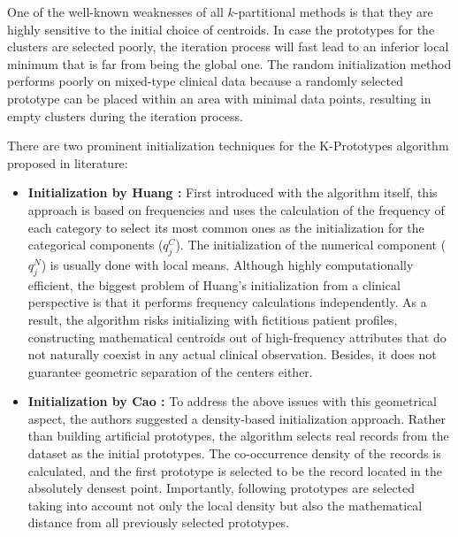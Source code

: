 One of the well-known weaknesses of all $k$-partitional methods is that they are highly sensitive to the initial choice of centroids. In case the prototypes for the clusters are selected poorly, the iteration process will fast lead to an inferior local minimum that is far from being the global one. The random initialization method performs poorly on mixed-type clinical data because a randomly selected prototype can be placed within an area with minimal data points, resulting in empty clusters during the iteration process.

\vspace{1em}

There are two prominent initialization techniques for the K-Prototypes algorithm proposed in literature:

\begin{itemize}
    \item \textbf{Initialization by Huang \cite{huang1998}:} First introduced with the algorithm itself, this approach is based on frequencies and uses the calculation of the frequency of each category to select its most common ones as the initialization for the categorical components ($q_j^C$). The initialization of the numerical component ($q_j^N$) is usually done with local means. Although highly computationally efficient, the biggest problem of Huang's initialization from a clinical perspective is that it performs frequency calculations independently. As a result, the algorithm risks initializing with fictitious patient profiles, constructing mathematical centroids out of high-frequency attributes that do not naturally coexist in any actual clinical observation. Besides, it does not guarantee geometric separation of the centers either.

    \item \textbf{Initialization by Cao \cite{cao2009}:} To address the above issues with this geometrical aspect, the authors suggested a density-based initialization approach. Rather than building artificial prototypes, the algorithm selects real records from the dataset as the initial prototypes. The co-occurrence density of the records is calculated, and the first prototype is selected to be the record located in the absolutely densest point. Importantly, following prototypes are selected taking into account not only the local density but also the mathematical distance from all previously selected prototypes.
\end{itemize}

\vspace{1em}

